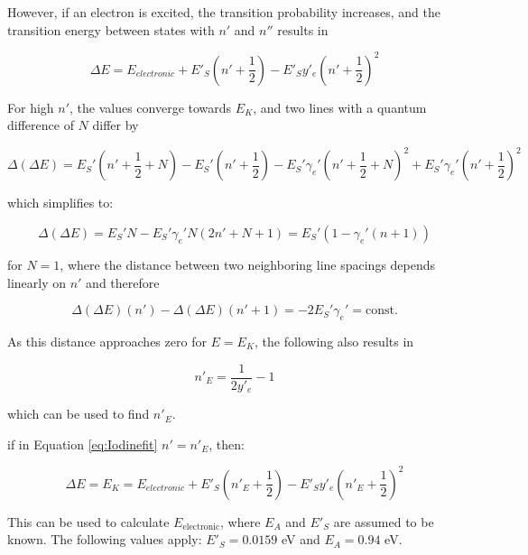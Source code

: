 \documentclass{article}
\begin{document}
However, if an electron is excited, the transition probability increases, and the transition energy between states with $n'$ and $n''$ results in

\begin{equation}
	\label{eq:Iodinefit}
	\Delta E = E_{electronic} + E'_S \left(n' + \frac{1}{2}\right) - E'_S y'_e\left(n' + \frac{1}{2}\right)^2
\end{equation}

For high $n'$, the values converge towards $E_K$, and two lines with a quantum difference of $N$ differ by

\begin{equation*}
\Delta(\Delta E) = E_S' \left(n' + \frac{1}{2} + N\right) - E_S' \left(n' + \frac{1}{2}\right) - E_S' \gamma_e' \left(n' + \frac{1}{2} + N\right)^2 + E_S' \gamma_e' \left(n' + \frac{1}{2}\right)^2
\end{equation*}

which simplifies to:

\begin{equation*}
\Delta(\Delta E) = E_S' N - E_S' \gamma_e' N(2n' + N + 1) = E_S' \left(1 - \gamma_e' (n + 1)\right)
\end{equation*}

for $N = 1$, where the distance between two neighboring line spacings depends linearly on $n'$ and therefore

\begin{equation*}
\Delta(\Delta E)(n') - \Delta(\Delta E)(n' + 1) = -2E_S' \gamma_e' = \text{const.}
\end{equation*}

As this distance approaches zero for $E = E_K$, the following also results in

\begin{equation}
	\label{eq:ne}
	n'_E = \frac{1}{2y'_e} -1
\end{equation}

which can be used to find $n'_E$.

if in Equation \ref{eq:Iodinefit} $n' = n'_E$, then:

\begin{equation}
	\label{eq:convergence}
	\Delta E = E_K = E_{electronic} + E'_S \left(n'_E + \frac{1}{2}\right) - E'_S y'_e\left(n'_E + \frac{1}{2}\right)^2
\end{equation}

This can be used to calculate $E_{\text{electronic}}$, where $E_A$ and $E'_S$ are assumed to be known. The following values apply: $E'_S = 0.0159$ eV and $E_A = 0.94$ eV.
\end{document}
